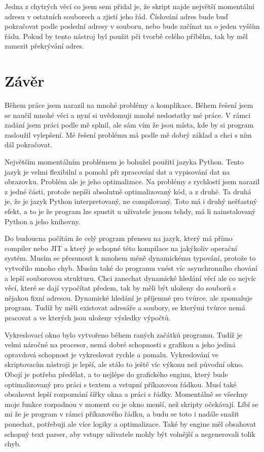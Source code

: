 \documentclass[12pt,a4paper]{article}
\begin{document}
Jedna z chytrých věcí co jsem sem přidal je, že skript najde největší momentální adresu v ostatních souborech a zjistí jeho řád. Číslování adres bude buď pokračovat podle poslední adresy v souboru, nebo bude začínat na o jeden vyšším řádu. Pokud by tento nástroj byl použit pči tvorbě celého příběhu, tak by měl zamezit překrývání adres.


\section{Závěr}
Během práce jsem narazil na mnohé problémy a komplikace. Během řešení jsem se naučil mnohé věci a nyní si uvědomuji mnohé nedostatky mé práce. V rámci zadání jsem práci podle mě splnil, ale sám vím že jsou místa, kde by si program zasloužil vylepšení. Mé řešení problému má podle mě dobrý základ a chci s ním dál pokračovat.

Největším momentálním problémem je bohužel použití jazyka Python. Tento jazyk je velmi flexibilní a pomohl při zpracování dat a vypisování dat na obrazovku. Problém ale je jeho optimalizace. Na problémy s rychlostí jsem narazil z jedné části, protože nepíši absolutně optimalizovaný kód, a z druhé. Ta druhá je, že je jazyk Python interpretovaný, ne compilovaný. Toto má i druhý nešťastný efekt, a to je že program lze spustit u uživatele jenom tehdy, má li nainstalovaný Python a jeho knihovny.

Do budoucna počítám že celý program přenesu na jazyk, který má přímo compiler nebo JIT a který je schopné této kompilace na jakýkoliv operační systém. Musím se přesunout k mnohem méně dynamickému typování, protože to vytvořilo mnoho chyb. Musím také do programu vnést víc asynchronního chování a lepší souborovou strukturu. Chci zanechat dynamické hledání věcí ale co nejvíc věcí, které se dají vypočítat předem, tak by měli být uloženy do souborů s nějakou fixní adresou. Dynamické hledání je příjemné pro tvůrce, ale zpomaluje program. Tudíž by měli existovat adresáře a soubory, se kterými tvůrce nemá pracovat a ve kterých jsou uloženy výsledky výpočtů.

Vykreslovací okno bylo vytvořeno během raných začátků programu. Tudíž je velmi náročné na procesor, nemá dobré schopnosti s grafikou a jeho jediná opravdová schopnost je vykreslovat rychle a pomalu. Vykreslování ve skriptovacím nástroji je lepší, ale stálo to ještě víc výkonu než původní okno. Obojí je potřeba předělat, a to nejlépe do grafického enginu, který bude optimalizovaný pro práci s textem a vstupní příkazovou řádkou. Musí také obsahovat lepší rozpoznání šířky okna a práci s řádky. Momentálně se všechny moje funkce rozpadnou v moment co je okno menší, než skripty očekávají. Líbí se mi že je program v rámci příkazového řádku, a budu se toto i nadále snažit ponechat, potřebuji ale více logiky a optimalizace. Také by engine měl obsahovat schopný text parser, aby vstupy uživatele mohly být volnější a negenerovali tolik chyb.
\end{document}
